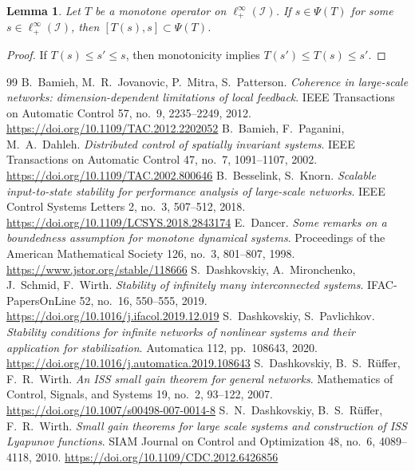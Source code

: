 \documentclass[10pt, oneside, a4paper]{article}
\newcommand{\IC}{\mathcal{I}}
\newtheorem{lemma}{Lemma}[section]
\begin{document}
\begin{lemma}\label{lem_decay_set}
Let $T$ be a monotone operator on $\ell^{\infty}_+(\IC)$. If $s \in \Psi(T)$ for some $s \in \ell^{\infty}_+(\IC)$, then $[T(s),s] \subset \Psi(T)$.
\end{lemma}

\begin{proof}
If $T(s) \leq s' \leq s$, then monotonicity implies $T(s') \leq T(s) \leq s'$.
\end{proof}

\begin{thebibliography}{99}
 B.~Bamieh, M.~R.~Jovanovic, P.~Mitra, S.~Patterson. \emph{Coherence in large-scale networks: dimension-dependent limitations of local feedback}. IEEE Transactions on Automatic Control 57,  no.~9, 2235--2249, 2012. \url{https://doi.org/10.1109/TAC.2012.2202052}%
 B.~Bamieh, F.~Paganini, M.~A.~Dahleh. \emph{Distributed control of spatially invariant systems}. IEEE Transactions on Automatic Control 47, no.~7, 1091--1107, 2002. \url{https://doi.org/10.1109/TAC.2002.800646}%
 B.~Besselink, S.~Knorn. \emph{Scalable input-to-state stability for performance analysis of large-scale networks}. IEEE Control Systems Letters 2, no.~3, 507--512, 2018. \url{https://doi.org/10.1109/LCSYS.2018.2843174}%
 E.~Dancer. \emph{Some remarks on a boundedness assumption for monotone dynamical systems}. Proceedings of the American Mathematical Society 126, no.~3, 801--807, 1998. \url{https://www.jstor.org/stable/118666}%
 S.~Dashkovskiy, A.~Mironchenko, J.~Schmid, F.~Wirth. \emph{Stability of infinitely many interconnected systems}. IFAC-PapersOnLine 52, no.~16, 550--555, 2019. \url{https://doi.org/10.1016/j.ifacol.2019.12.019}%
 S.~Dashkovskiy, S.~Pavlichkov. \emph{Stability conditions for infinite networks of nonlinear systems and their application for stabilization}. Automatica 112, pp.~108643, 2020. \url{https://doi.org/10.1016/j.automatica.2019.108643}%
 S.~Dashkovskiy, B.~S.~R{\"u}ffer, F.~R.~Wirth. \emph{An ISS small gain theorem for general networks}. Mathematics of Control, Signals, and Systems 19, no.~2, 93--122, 2007. \url{https://doi.org/10.1007/s00498-007-0014-8}%
 S.~N.~Dashkovskiy, B.~S.~R{\"u}ffer, F.~R.~Wirth. \emph{Small gain theorems for large scale systems and construction of ISS Lyapunov functions}. SIAM Journal on Control and Optimization 48, no.~6, 4089--4118, 2010. \url{https://doi.org/10.1109/CDC.2012.6426856}%

\end{thebibliography}
\end{document}
